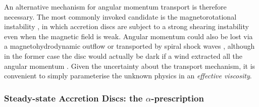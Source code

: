 An alternative mechanism for angular momentum transport is therefore
necessary. The most commonly invoked
candidate is the magnetorotational instability \citep[MRI; ][]{balbus1991},
in which accretion discs are subject to a strong shearing instability even
when the magnetic field is weak. 
Angular momentum could also be lost via a magnetohydrodynamic 
outflow \citep{blandfordpayne} or transported by spiral shock waves
\citep{ju2016}, although in the former case the disc would actually
be dark if a wind extracted all the angular momentum 
\citep[e.g.][]{spruit1996,knigge1999}. 
Given the uncertainty about the transport mechanism, it is 
convenient to simply parameterise the unknown physics in 
an {\em effective viscosity}.





\subsubsection{Steady-state Accretion Discs: the $\alpha$-prescription}

